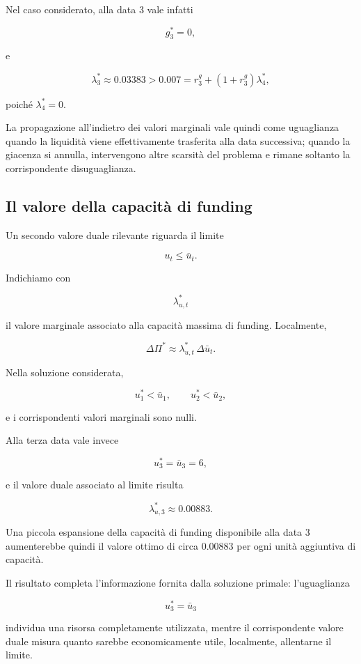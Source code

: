 Nel caso considerato, alla data $3$ vale infatti

\[
g_3^*=0,
\]

\noindent e

\[
\lambda_3^*
\approx
0.03383
>
0.007
=
r_3^{g}+(1+r_3^{g})\lambda_4^*,
\]

\noindent poich\'{e} $\lambda_4^*=0$.

La propagazione all'indietro dei valori marginali vale quindi come
uguaglianza quando la liquidit\`{a} viene effettivamente trasferita alla data successiva; quando la giacenza si annulla, intervengono altre scarsit\`{a} del
problema e rimane soltanto la corrispondente disuguaglianza.

\subsection{Il valore della capacit\`a di funding}

Un secondo valore duale rilevante riguarda il limite

\[
u_t\leq\bar u_t.
\]

Indichiamo con

\[
\lambda_{u,t}^*
\]

\noindent il valore marginale associato alla capacit\`a massima di funding. Localmente,

\[
\Delta\Pi^*
\approx
\lambda_{u,t}^*\,\Delta\bar u_t.
\]

Nella soluzione considerata,

\[
u_1^*<\bar u_1,
\qquad
u_2^*<\bar u_2,
\]

\noindent e i corrispondenti valori marginali sono nulli.

Alla terza data vale invece

\[
u_3^*
=
\bar u_3
=
6,
\]

\noindent e il valore duale associato al limite risulta

\[
\lambda_{u,3}^*
\approx
0.00883.
\]

Una piccola espansione della capacit\`a di funding disponibile alla data $3$
aumenterebbe quindi il valore ottimo di circa $0.00883$ per ogni unit\`a
aggiuntiva di capacit\`a.

Il risultato completa l'informazione fornita dalla soluzione primale:
l'uguaglianza

\[
u_3^*=\bar u_3
\]

\noindent individua una risorsa completamente utilizzata, mentre il corrispondente
valore duale misura quanto sarebbe economicamente utile, localmente,
allentarne il limite.

